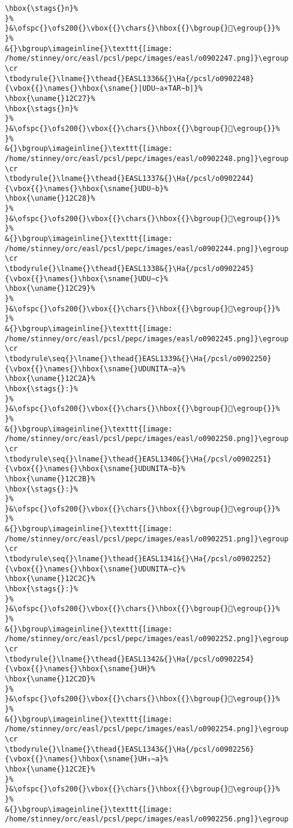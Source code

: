 \begin{verbatim}
\hbox{\stags{}n}%
}%
}&\ofspc{}\ofs200{}\vbox{{}\chars{}\hbox{{}\bgroup{}𒰦\egroup{}}%
}%
&{}\bgroup\imageinline{}\texttt{[image: /home/stinney/orc/easl/pcsl/pepc/images/easl/o0902247.png]}\egroup
\cr
\tbodyrule{}\lname{}\thead{}EASL1336&{}\Ha{/pcsl/o0902248}{\vbox{{}\names{}\hbox{\sname{}|UDU∼a×TAR∼b|}%
\hbox{\uname{}12C27}%
\hbox{\stags{}n}%
}%
}&\ofspc{}\ofs200{}\vbox{{}\chars{}\hbox{{}\bgroup{}𒰧\egroup{}}%
}%
&{}\bgroup\imageinline{}\texttt{[image: /home/stinney/orc/easl/pcsl/pepc/images/easl/o0902248.png]}\egroup
\cr
\tbodyrule{}\lname{}\thead{}EASL1337&{}\Ha{/pcsl/o0902244}{\vbox{{}\names{}\hbox{\sname{}UDU∼b}%
\hbox{\uname{}12C28}%
}%
}&\ofspc{}\ofs200{}\vbox{{}\chars{}\hbox{{}\bgroup{}𒰨\egroup{}}%
}%
&{}\bgroup\imageinline{}\texttt{[image: /home/stinney/orc/easl/pcsl/pepc/images/easl/o0902244.png]}\egroup
\cr
\tbodyrule{}\lname{}\thead{}EASL1338&{}\Ha{/pcsl/o0902245}{\vbox{{}\names{}\hbox{\sname{}UDU∼c}%
\hbox{\uname{}12C29}%
}%
}&\ofspc{}\ofs200{}\vbox{{}\chars{}\hbox{{}\bgroup{}𒰩\egroup{}}%
}%
&{}\bgroup\imageinline{}\texttt{[image: /home/stinney/orc/easl/pcsl/pepc/images/easl/o0902245.png]}\egroup
\cr
\tbodyrule\seq{}\lname{}\thead{}EASL1339&{}\Ha{/pcsl/o0902250}{\vbox{{}\names{}\hbox{\sname{}UDUNITA∼a}%
\hbox{\uname{}12C2A}%
\hbox{\stags{}:}%
}%
}&\ofspc{}\ofs200{}\vbox{{}\chars{}\hbox{{}\bgroup{}𒰪\egroup{}}%
}%
&{}\bgroup\imageinline{}\texttt{[image: /home/stinney/orc/easl/pcsl/pepc/images/easl/o0902250.png]}\egroup
\cr
\tbodyrule\seq{}\lname{}\thead{}EASL1340&{}\Ha{/pcsl/o0902251}{\vbox{{}\names{}\hbox{\sname{}UDUNITA∼b}%
\hbox{\uname{}12C2B}%
\hbox{\stags{}:}%
}%
}&\ofspc{}\ofs200{}\vbox{{}\chars{}\hbox{{}\bgroup{}𒰫\egroup{}}%
}%
&{}\bgroup\imageinline{}\texttt{[image: /home/stinney/orc/easl/pcsl/pepc/images/easl/o0902251.png]}\egroup
\cr
\tbodyrule\seq{}\lname{}\thead{}EASL1341&{}\Ha{/pcsl/o0902252}{\vbox{{}\names{}\hbox{\sname{}UDUNITA∼c}%
\hbox{\uname{}12C2C}%
\hbox{\stags{}:}%
}%
}&\ofspc{}\ofs200{}\vbox{{}\chars{}\hbox{{}\bgroup{}𒰬\egroup{}}%
}%
&{}\bgroup\imageinline{}\texttt{[image: /home/stinney/orc/easl/pcsl/pepc/images/easl/o0902252.png]}\egroup
\cr
\tbodyrule{}\lname{}\thead{}EASL1342&{}\Ha{/pcsl/o0902254}{\vbox{{}\names{}\hbox{\sname{}UH}%
\hbox{\uname{}12C2D}%
}%
}&\ofspc{}\ofs200{}\vbox{{}\chars{}\hbox{{}\bgroup{}𒰭\egroup{}}%
}%
&{}\bgroup\imageinline{}\texttt{[image: /home/stinney/orc/easl/pcsl/pepc/images/easl/o0902254.png]}\egroup
\cr
\tbodyrule{}\lname{}\thead{}EASL1343&{}\Ha{/pcsl/o0902256}{\vbox{{}\names{}\hbox{\sname{}UH₃∼a}%
\hbox{\uname{}12C2E}%
}%
}&\ofspc{}\ofs200{}\vbox{{}\chars{}\hbox{{}\bgroup{}𒰮\egroup{}}%
}%
&{}\bgroup\imageinline{}\texttt{[image: /home/stinney/orc/easl/pcsl/pepc/images/easl/o0902256.png]}\egroup

\end{verbatim}
